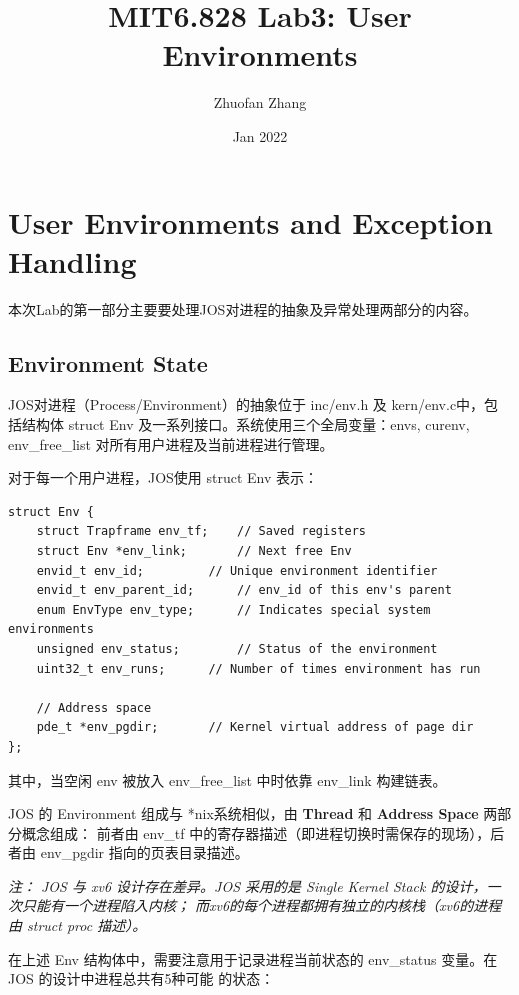 \documentclass[12pt, letterpaper]{report}
\title{MIT6.828 Lab3: User Environments}
\author{Zhuofan Zhang}
\date{Jan 2022}
\begin{document}
\maketitle
\renewcommand\contentsname{\Huge Contents}
\tableofcontents{}


\newpage
{}
\chapter[\Large User Environments and Exception Handling]{User Environments and Exception Handling}
本次Lab的第一部分主要要处理JOS对进程的抽象及异常处理两部分的内容。

\section[\large Environment State]{Environment State}
JOS对进程（Process/Environment）的抽象位于 inc/env.h 及 kern/env.c中，包括结构体  
struct Env 及一系列接口。系统使用三个全局变量：envs, curenv, env\_free\_list 对所有用户进程及当前进程进行管理。\par
对于每一个用户进程，JOS使用 struct Env 表示：
\lstset{style=CStyle}
\setmainfont{Consolas}
\begin{lstlisting}
struct Env {
    struct Trapframe env_tf;	// Saved registers
    struct Env *env_link;		// Next free Env
    envid_t env_id;			// Unique environment identifier
    envid_t env_parent_id;		// env_id of this env's parent
    enum EnvType env_type;		// Indicates special system environments
    unsigned env_status;		// Status of the environment
    uint32_t env_runs;		// Number of times environment has run

    // Address space
    pde_t *env_pgdir;		// Kernel virtual address of page dir
};
\end{lstlisting}
\setmainfont{Times New Roman}
其中，当空闲 env 被放入 env\_free\_list 中时依靠 env\_link 构建链表。\par
JOS 的 Environment 组成与 *nix系统相似，由 {\bf Thread} 和 {\bf Address Space} 两部分概念组成：
前者由 env\_tf 中的寄存器描述（即进程切换时需保存的现场），后者由 env\_pgdir 指向的页表目录描述。\par
\textsl{注： JOS 与 xv6 设计存在差异。JOS 采用的是 Single Kernel Stack 的设计，一次只能有一个进程陷入内核；
而xv6的每个进程都拥有独立的内核栈（xv6的进程由 struct proc 描述）。}\par
\newpage
在上述 Env 结构体中，需要注意用于记录进程当前状态的 env\_status 变量。在 JOS 的设计中进程总共有5种可能
的状态：\par
\quad \par 
\end{document}
